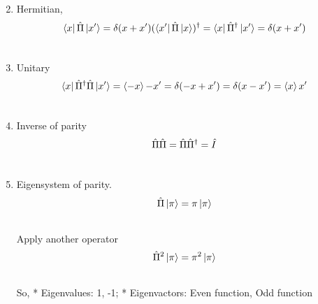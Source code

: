 \documentclass[letterpaper,10pt,english]{sphinxmanual}
\begin{document}
\begin{enumerate}
\setcounter{enumi}{1}
\item {} 
Hermitian,
\begin{gather}
\begin{split}\bra{x}\hat \Pi \ket{x'} = \delta(x+x')
(\bra{x'}\hat \Pi \ket{x})^\dagger = \bra{x}\hat \Pi^\dagger \ket{x'} =\delta(x+x')\end{split}\notag\\\begin{split}\end{split}\notag
\end{gather}
\item {} 
Unitary
\begin{gather}
\begin{split}\bra{x}\hat \Pi^\dagger \hat \Pi \ket{x'}= \braket{-x}{-x'}=\delta(-x+x')=\delta(x-x')=\braket{x}{x'}\end{split}\notag\\\begin{split}\end{split}\notag
\end{gather}
\item {} 
Inverse of parity
\begin{gather}
\begin{split}\hat \Pi \hat \Pi = \hat \Pi \hat \Pi^\dagger = \hat I\end{split}\notag\\\begin{split}\end{split}\notag
\end{gather}
\item {} 
Eigensystem of parity.
\begin{gather}
\begin{split}\hat \Pi \ket{\pi}=\pi\ket{\pi}\end{split}\notag\\\begin{split}\end{split}\notag
\end{gather}
Apply another operator
\begin{gather}
\begin{split}\hat \Pi^2 \ket{\pi} = \pi^2 \ket{\pi}\end{split}\notag\\\begin{split}\end{split}\notag
\end{gather}
So,
* Eigenvalues: 1, -1;
* Eigenvactors: Even function, Odd function


\end{enumerate}
\end{document}
